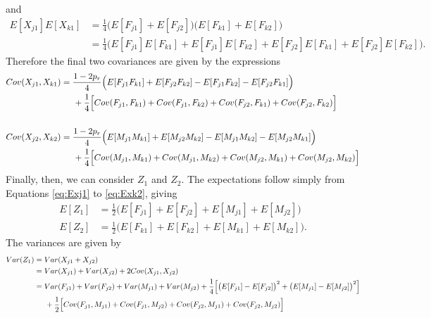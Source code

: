 \documentclass{article}
\begin{document}
and
\begin{align*}
  E[X_{j1}] E[X_{k1}] & = \frac{1}{4} \Big ( E[F_{j1}] + E[F_{j2}] \Big ) \Big ( E[F_{k1}] + E[F_{k2}] \Big ) \\
  & = \frac{1}{4} \Big ( E[F_{j1}] E[F_{k1}] + E[F_{j1}] E[F_{k2}] + E[F_{j2}] E[F_{k1}] + E[F_{j2}] E[F_{k2}] \Big ).
\end{align*}
Therefore the final two covariances are given by the expressions
\begin{align}
  Cov(X_{j1}, X_{k1}) & = \frac{1 - 2 p_r}{4} \Big ( E[F_{j1} F_{k1}] + E[F_{j2} F_{k2}] - E[F_{j1} F_{k2}] - E[F_{j2} F_{k1}] \Big ) \nonumber \\
                      & \hspace{0.5cm} + \frac{1}{4} \Big [ Cov(F_{j1}, F_{k1}) + Cov(F_{j1}, F_{k2}) + Cov(F_{j2}, F_{k1}) + Cov(F_{j2}, F_{k2}) \Big ] \label{eq:covj1k1} \\
  & \nonumber \\
  Cov(X_{j2}, X_{k2}) & = \frac{1 - 2 p_r}{4} \Big ( E[M_{j1} M_{k1}] + E[M_{j2} M_{k2}] - E[M_{j1} M_{k2}] - E[M_{j2} M_{k1}] \Big ) \nonumber \\
                      & \hspace{0.5cm} + \frac{1}{4} \Big [ Cov(M_{j1}, M_{k1}) + Cov(M_{j1}, M_{k2}) + Cov(M_{j2}, M_{k1}) + Cov(M_{j2}, M_{k2}) \Big ] \label{eq:covj2k1} 
\end{align}
Finally, then, we can consider $Z_1$ and $Z_2$. The expectations follow simply from Equations \ref{eq:Exj1} to \ref{eq:Exk2}, giving
\begin{align}
  E[Z_1] & = \frac{1}{2} \Big ( E[F_{j1}] + E[F_{j2}] + E[M_{j1}] + E[M_{j2}] \Big ) \label{eq:Ez1} \\
  E[Z_2] & = \frac{1}{2} \Big ( E[F_{k1}] + E[F_{k2}] + E[M_{k1}] + E[M_{k2}] \Big ). \label{eq:Ez2}
\end{align}
The variances are given by
\begin{align*}
  Var(Z_1) & = Var(X_{j1} + X_{j2}) \\
           & = Var(X_{j1}) + Var(X_{j2}) + 2 Cov(X_{j1}, X_{j2}) \\
           & = Var(F_{j1}) + Var(F_{j2}) + Var(M_{j1}) + Var(M_{j2}) + \frac{1}{4} \Big [ \big ( E[F_{j1}] - E[F_{j2}] \big )^2 + \big ( E[M_{j1}] - E[M_{j2}] \big )^2 \Big ] \\
  & \hspace{0.5cm} + \frac{1}{2} \Big [ Cov(F_{j1}, M_{j1}) + Cov(F_{j1}, M_{j2}) + Cov(F_{j2}, M_{j1}) + Cov(F_{j2}, M_{j2}) \Big ]
\end{align*}
\end{document}
